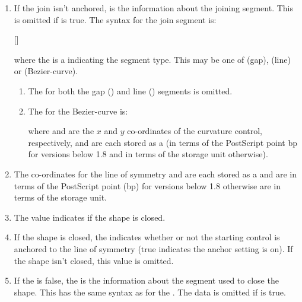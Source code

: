 \begin{numbered}
\begin{enumerate}
\begin{enumerate}
  \item\label{jdr:joinsegment}%
  If the join isn't anchored,  is the
  information about the joining segment. This is omitted if
   is true. The syntax for the join segment is:
  \begin{syntaxline}
   []
  \end{syntaxline}
  where the  is a  indicating the
  segment type. This may be one of  (gap), 
  (line) or  (\gls{Bezier-curve}).
    \begin{enumerate}
    \item The  for both the gap () and
    line () segments is omitted.

    \item The  for the \gls{Bezier-curve} is:
    \begin{syntaxline}
     
    \end{syntaxline}
    where  and  are the $x$ and
    $y$ \glspl{co-ordinate} of the curvature
    control, respectively, and are each stored as a 
    (in terms of the PostScript point \gls{bp} for versions below
    1.8 and in terms of the storage unit otherwise).

    \end{enumerate}

  \item The \glspl{co-ordinate} for the line of symmetry
     and
   are each stored as a  and are in
  terms of the PostScript point (\gls{bp}) for versions below 1.8
  otherwise are in terms of the storage unit.

  \item The  value  indicates if the
  shape is closed.

  \item If the shape is closed, the  
  indicates whether or not the starting control is anchored to the
  line of symmetry (true indicates the anchor setting is on).
  If the shape isn't closed, this value is omitted.

  \item If the  is false, the  is the information about the segment used to close the
  shape. This has the same syntax as for the
  \hyperref[jdr:joinsegment]{}. The 
  data is omitted if  is true.
  \end{enumerate}


\end{enumerate}
\end{numbered}
